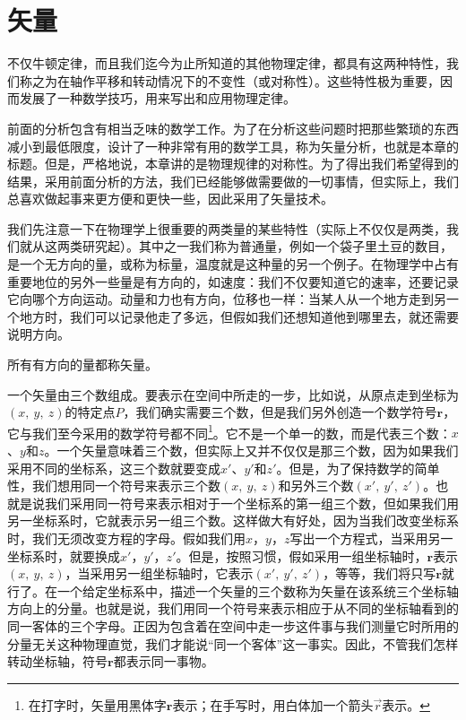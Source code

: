 \section{矢量}

不仅牛顿定律，而且我们迄今为止所知道的其他物理定律，都具有这两种特性，我们称之为在轴作平移和转动情况下的不变性（或对称性）。这些特性极为重要，因而发展了一种数学技巧，用来写出和应用物理定律。

前面的分析包含有相当乏味的数学工作。为了在分析这些问题时把那些繁琐的东西减小到最低限度，设计了一种非常有用的数学工具，称为矢量分析，也就是本章的标题。但是，严格地说，本章讲的是物理规律的对称性。为了得出我们希望得到的结果，采用前面分析的方法，我们已经能够做需要做的一切事情，但实际上，我们总喜欢做起事来更方便和更快一些，因此采用了矢量技术。

我们先注意一下在物理学上很重要的两类量的某些特性（实际上不仅仅是两类，我们就从这两类研究起）。其中之一我们称为普通量，例如一个袋子里土豆的数目，是一个无方向的量，或称为标量，温度就是这种量的另一个例子。在物理学中占有重要地位的另外一些量是有方向的，如速度：我们不仅要知道它的速率，还要记录它向哪个方向运动。动量和力也有方向，位移也一样：当某人从一个地方走到另一个地方时，我们可以记录他走了多远，但假如我们还想知道他到哪里去，就还需要说明方向。

所有有方向的量都称矢量。

一个矢量由三个数组成。要表示在空间中所走的一步，比如说，从原点走到坐标为$(x,~y,~z)$的特定点$P$，我们确实需要三个数，但是我们另外创造一个数学符号$\boldsymbol{r}$，它与我们至今采用的数学符号都不同\footnote{在打字时，矢量用黑体字$\boldsymbol{r}$表示；在手写时，用白体加一个箭头$\vec{r}$表示。}。它不是一个单一的数，而是代表三个数：$x$、$y$和$z$。一个矢量意味着三个数，但实际上又并不仅仅是那三个数，因为如果我们采用不同的坐标系，这三个数就要变成$x'$、$y'$和$z'$。但是，为了保持数学的简单性，我们想用同一个符号来表示三个数$(x,~y,~z)$和另外三个数$(x',~y',~z')$。也就是说我们采用同一符号来表示相对于一个坐标系的第一组三个数，但如果我们用另一坐标系时，它就表示另一组三个数。这样做大有好处，因为当我们改变坐标系时，我们无须改变方程的字母。假如我们用$x$，$y$，$z$写出一个方程式，当采用另一坐标系时，就要换成$x'$，$y'$，$z'$。但是，按照习惯，假如采用一组坐标轴时，$\boldsymbol{r}$表示$(x,~y,~z)$，当采用另一组坐标轴时，它表示$(x',~y',~z')$，等等，我们将只写$\boldsymbol{r}$就行了。在一个给定坐标系中，描述一个矢量的三个数称为矢量在该系统三个坐标轴方向上的分量。也就是说，我们用同一个符号来表示相应于从不同的坐标轴看到的同一客体的三个字母。正因为包含着在空间中走一步这件事与我们测量它时所用的分量无关这种物理直觉，我们才能说“同一个客体”这一事实。因此，不管我们怎样转动坐标轴，符号$\boldsymbol{r}$都表示同一事物。

